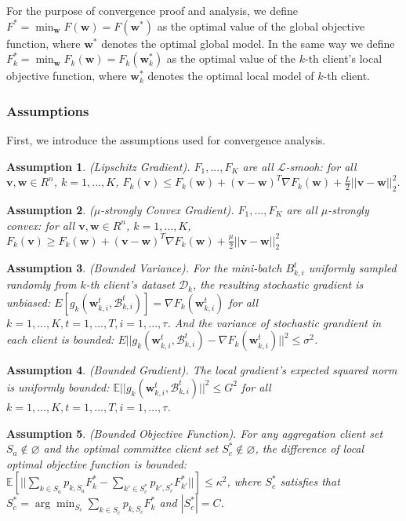 \documentclass[10pt,journal,compsoc]{IEEEtran}
\newtheorem{assumption}{Assumption}
\newcommand{\w}{\mathbf{w}}
\newcommand{\D}{\mathcal{D}}
\newcommand{\B}{\mathcal{B}}
\begin{document}
For the purpose of convergence proof and analysis, we define $F^* = \min_{\w}F(\w) = F(\w^*)$ as the optimal value of the global objective function, where $\w^*$ denotes the optimal global model. In the same way we define $F_k^* = \min_{\w}F_k(\w) = F_k(\w_k^*)$ as the optimal value of the $k$-th client's local objective function, where $\w_k^*$ denotes the optimal local model of $k$-th client.

\subsubsection{Assumptions}\label{assumption}

First, we introduce the assumptions used for convergence analysis.

\begin{assumption}\label{A1} 
(Lipschitz Gradient). \textit{$F_1,...,F_K$ are all $\mathcal{L}$-smooh: for all $\mathbf{v}, \w \in R^n$, $k = 1, ..., K$, $F_k(\mathbf{v}) \leq F_k(\w) + (\mathbf{v}-\w)^T\nabla F_k(\w) + \frac{L}{2}||\mathbf{v}-\w||^2_2$.}
\end{assumption}

\begin{assumption}\label{A2} 
($\mu$-strongly Convex Gradient). \textit{$F_1,...,F_K$ are all $\mu$-strongly convex: for all $\mathbf{v}, \w \in R^n$, $k = 1, ..., K$, $F_k(\mathbf{v}) \geq F_k(\w) + (\mathbf{v}-\w)^T\nabla F_k(\w) + \frac{\mu}{2}||\mathbf{v}-\w||^2_2$}
\end{assumption}


\begin{assumption}\label{A3} 
(Bounded Variance). \textit{For the mini-batch $B_{k,i}^t$ uniformly sampled randomly from $k$-th client's dataset $\D_k$, the resulting stochastic gradient is unbiased: $E[g_k(\w_{k,i}^t,\B_{k,i}^t)]=\nabla F_k(\w_{k,i}^t)$ for all $k=1,...,K, t=1,...,T, i=1,...,\tau$. And the variance of stochastic grandient in each client is bounded: $E||g_k(\w_{k,i}^t,\B_{k,i}^t)-\nabla F_k(\w_{k,i}^t)||^2 \leq \sigma^2$.}
\end{assumption}

\begin{assumption}\label{A4}
(Bounded Gradient). \textit{The local gradient's expected squared norm is uniformly bounded: $\mathbb{E}||g_k(\w_{k,i}^t,\B_{k,i}^t)||^2 \leq G^2$ for all $k = 1,...,K,t=1,...,T, i=1,...,\tau$.}
\end{assumption}

\begin{assumption}\label{A5}
(Bounded Objective Function). \textit{For any aggregation client set $S_a\notin \varnothing$ and the optimal committee client set $S_c^* \notin \varnothing$, the difference of local optimal objective function is bounded: $\mathbb{E}[||\sum_{k \in S_a}p_{k,S_a}F_k^*-\sum_{k' \in S_c^*}p_{k',S_c^*}F_{k'}^*||] \leq \kappa^2$, where $S_c^*$ satisfies that $S_c^* = \arg\min_{S_c}\sum_{k\in S_c}p_{k,S_c}F_k^*$ and $|S_c^*| = C$.} 
\end{assumption}
\end{document}
